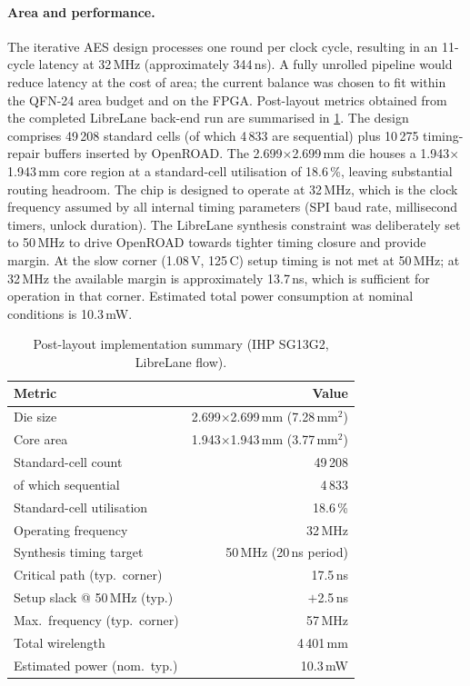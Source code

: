 \documentclass[manuscript,screen,nonacm]{acmart}
\begin{document}
\paragraph{Area and performance.}
The iterative AES design processes one round per clock cycle,
resulting in an 11-cycle latency at 32\,MHz (approximately 344\,ns).
A fully unrolled pipeline would reduce latency at the cost of area;
the current balance was chosen to fit within the QFN-24 area budget
and on the FPGA.
Post-layout metrics obtained from the completed LibreLane back-end run
are summarised in \cref{tab:area}.
The design comprises 49\,208 standard cells (of which 4\,833 are
sequential) plus 10\,275 timing-repair buffers inserted by OpenROAD.
The 2.699$\times$2.699\,mm die houses a 1.943$\times$1.943\,mm core
region at a standard-cell utilisation of 18.6\,\%, leaving substantial
routing headroom.
The chip is designed to operate at 32\,MHz, which is the clock
frequency assumed by all internal timing parameters (SPI baud rate,
millisecond timers, unlock duration).
The LibreLane synthesis constraint was deliberately set to 50\,MHz
to drive OpenROAD towards tighter timing closure and provide margin.
At the slow corner (1.08\,V, 125\,\textdegree{}C) setup timing is not
met at 50\,MHz; at 32\,MHz the available margin is approximately
13.7\,ns, which is sufficient for operation in that corner.
Estimated total power consumption at nominal conditions is 10.3\,mW.

\begin{table}[h]
  \centering
  \caption{Post-layout implementation summary (IHP SG13G2, LibreLane flow).}
  \label{tab:area}
  \begin{tabular}{lr}
    \toprule
    \textbf{Metric} & \textbf{Value} \\
    \midrule
    Die size                         & 2.699$\times$2.699\,mm (7.28\,mm$^2$) \\
    Core area                        & 1.943$\times$1.943\,mm (3.77\,mm$^2$) \\
    Standard-cell count              & 49\,208 \\
    \quad of which sequential        & 4\,833 \\
    Standard-cell utilisation        & 18.6\,\% \\
    Operating frequency              & 32\,MHz \\
    Synthesis timing target          & 50\,MHz (20\,ns period) \\
    Critical path (typ.\ corner)     & 17.5\,ns \\
    Setup slack @ 50\,MHz (typ.)     & $+$2.5\,ns \\
    Max.\ frequency (typ.\ corner)   & 57\,MHz \\
    Total wirelength                 & 4\,401\,mm \\
    Estimated power (nom.\ typ.)     & 10.3\,mW \\
    \bottomrule
  \end{tabular}
\end{table}
\end{document}
